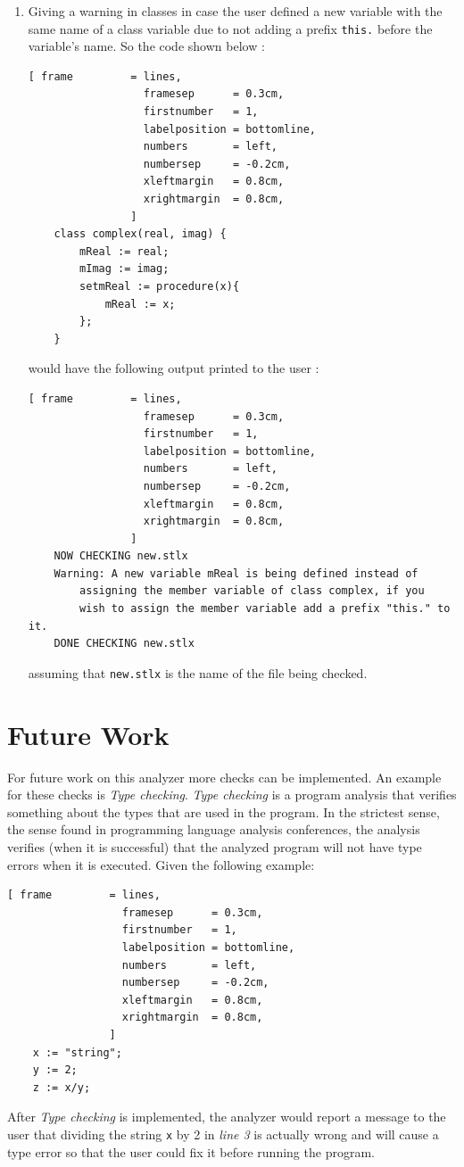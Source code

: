 \documentclass[11pt]{report}
\begin{document}
\begin{enumerate}
\item Giving a warning in classes in case the user defined a new variable with the same name of a class variable due to not adding a prefix \texttt{this.} before the variable's name. So the code shown below :
\pagebreak
\begin{Verbatim}[ frame         = lines, 
                  framesep      = 0.3cm, 
                  firstnumber   = 1,
                  labelposition = bottomline,
                  numbers       = left,
                  numbersep     = -0.2cm,
                  xleftmargin   = 0.8cm,
                  xrightmargin  = 0.8cm,
                ]
    class complex(real, imag) {
        mReal := real;
        mImag := imag;
        setmReal := procedure(x){
	        mReal := x;
        };
    }
\end{Verbatim}
would have the following output printed to the user :
\begin{Verbatim}[ frame         = lines, 
                  framesep      = 0.3cm, 
                  firstnumber   = 1,
                  labelposition = bottomline,
                  numbers       = left,
                  numbersep     = -0.2cm,
                  xleftmargin   = 0.8cm,
                  xrightmargin  = 0.8cm,
                ]
    NOW CHECKING new.stlx
    Warning: A new variable mReal is being defined instead of 
        assigning the member variable of class complex, if you 
        wish to assign the member variable add a prefix "this." to it.
    DONE CHECKING new.stlx
\end{Verbatim}
assuming that \texttt{new.stlx} is the name of the file being checked.
\end{enumerate}

\section{Future Work}
For future work on this analyzer more checks can be implemented. An example for these checks is \textsl{Type checking}. \textsl{Type checking} is a program analysis that verifies something about the types that are used in the program.
In the strictest sense, the sense found in programming language analysis conferences, the analysis verifies (when it is successful) that the analyzed program will not have type errors when it is executed. Given the following example: 
\begin{Verbatim}[ frame         = lines, 
                  framesep      = 0.3cm, 
                  firstnumber   = 1,
                  labelposition = bottomline,
                  numbers       = left,
                  numbersep     = -0.2cm,
                  xleftmargin   = 0.8cm,
                  xrightmargin  = 0.8cm,
                ]
    x := "string";
    y := 2;
    z := x/y;
\end{Verbatim}
After \textsl{Type checking} is implemented, the analyzer would report a message to the user that dividing the string \texttt{x} by 2 in \textsl{line 3} is actually wrong and will cause a type error so that the user could fix it before running the program.







\end{document}
